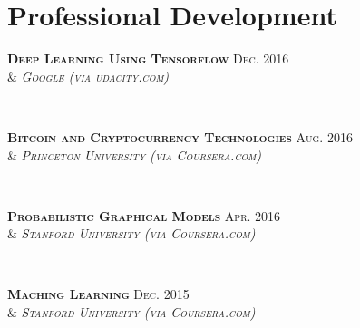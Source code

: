 \documentclass[10pt]{article} %
\begin{document}
\begin{minipage}[t]{0.43\textwidth}
\section{Professional Development} 
{\raggedright\textsc{\textbf{Deep Learning Using Tensorflow} \hfill Dec. 2016\\
& \textit{Google (via udacity.com)}}} \\

{\raggedright\textsc{\textbf{Bitcoin and Cryptocurrency Technologies} \hfill Aug. 2016\\
    & \textit{Princeton University (via Coursera.com)}}} \\

{\raggedright\textsc{\textbf{Probabilistic Graphical Models} \hfill Apr. 2016\\
& \textit{Stanford University (via Coursera.com)}}} \\

{\raggedright\textsc{\textbf{Maching Learning} \hfill Dec. 2015\\
& \textit{Stanford University (via Coursera.com)}}} \\




%




\end{minipage}
\end{document}
